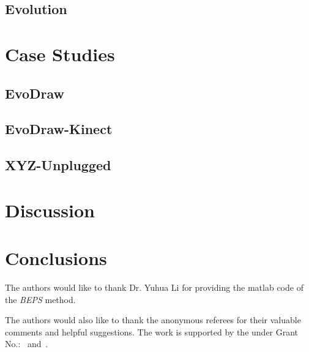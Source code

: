   \subsection{Evolution}

\section{Case Studies}
\subsection{EvoDraw}
\subsection{EvoDraw-Kinect}
\subsection{XYZ-Unplugged}

\section{Discussion}
\section{Conclusions}

\begin{acks}
  The authors would like to thank Dr. Yuhua Li for providing the
  matlab code of  the \textit{BEPS} method. 

  The authors would also like to thank the anonymous referees for
  their valuable comments and helpful suggestions. The work is
  supported by the  under Grant
  No.:~
  and~.

\end{acks}
